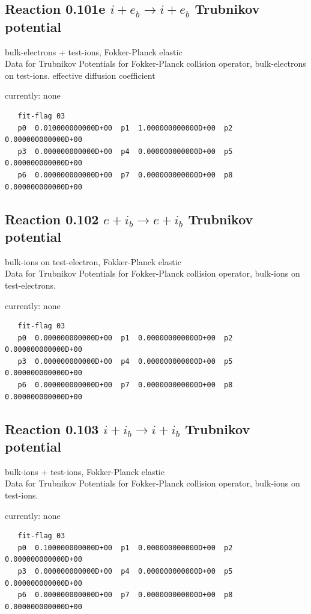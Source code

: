 \documentclass[12pt,dvipdfmx]{article}
\begin{document}
\subsection{
Reaction 0.101e  $ i + e_b \rightarrow i + e_b$ Trubnikov potential}
bulk-electrons + test-ions, Fokker-Planck elastic \\
Data for Trubnikov Potentials for Fokker-Planck collision
operator, bulk-electrons on test-ions. effective diffusion coefficient

currently: none


\begin{small}\begin{verbatim}
   fit-flag 03
   p0  0.010000000000D+00  p1  1.000000000000D+00  p2  0.000000000000D+00
   p3  0.000000000000D+00  p4  0.000000000000D+00  p5  0.000000000000D+00
   p6  0.000000000000D+00  p7  0.000000000000D+00  p8  0.000000000000D+00
\end{verbatim}\end{small}


\subsection{
Reaction 0.102 $ e + i_b \rightarrow e + i_b$ Trubnikov potential}
bulk-ions on test-electron, Fokker-Planck elastic \\
Data for Trubnikov Potentials for Fokker-Planck collision
operator, bulk-ions on test-electrons.


currently: none

\begin{small}\begin{verbatim}
   fit-flag 03
   p0  0.000000000000D+00  p1  0.000000000000D+00  p2  0.000000000000D+00
   p3  0.000000000000D+00  p4  0.000000000000D+00  p5  0.000000000000D+00
   p6  0.000000000000D+00  p7  0.000000000000D+00  p8  0.000000000000D+00
\end{verbatim}\end{small}

\subsection{
Reaction 0.103 $ i + i_b \rightarrow i + i_b$ Trubnikov potential}
bulk-ions + test-ions, Fokker-Planck elastic \\
Data for Trubnikov Potentials for Fokker-Planck collision
operator, bulk-ions on test-ions.

currently: none

\begin{small}\begin{verbatim}
   fit-flag 03
   p0  0.100000000000D+00  p1  0.000000000000D+00  p2  0.000000000000D+00
   p3  0.000000000000D+00  p4  0.000000000000D+00  p5  0.000000000000D+00
   p6  0.000000000000D+00  p7  0.000000000000D+00  p8  0.000000000000D+00
\end{verbatim}\end{small}
\end{document}
